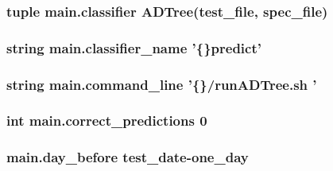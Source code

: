 \hypertarget{namespacemain_a07830f194ffad5f009530ec549a93b5f}{
\subsubsection[{classifier}]{\setlength{\rightskip}{0pt plus 5cm}tuple main.\-classifier {\bf A\-D\-Tree}({\bf test\-\_\-file}, {\bf spec\-\_\-file})}}\label{namespacemain_a07830f194ffad5f009530ec549a93b5f}
\hypertarget{namespacemain_ab4ac9dda3d2fa82f888de091614f6090}{
\subsubsection[{classifier\-\_\-name}]{\setlength{\rightskip}{0pt plus 5cm}string main.\-classifier\-\_\-name '\{\}predict'}}\label{namespacemain_ab4ac9dda3d2fa82f888de091614f6090}
\hypertarget{namespacemain_aafb9018fe880bf4127e57a72c103563b}{
\subsubsection[{command\-\_\-line}]{\setlength{\rightskip}{0pt plus 5cm}string main.\-command\-\_\-line '\{\}/run\-A\-D\-Tree.\-sh '}}\label{namespacemain_aafb9018fe880bf4127e57a72c103563b}
\hypertarget{namespacemain_af624554e0f6b710e1be0ba525c717b48}{
\subsubsection[{correct\-\_\-predictions}]{\setlength{\rightskip}{0pt plus 5cm}int main.\-correct\-\_\-predictions 0}}\label{namespacemain_af624554e0f6b710e1be0ba525c717b48}
\hypertarget{namespacemain_a13bddefadc5986a6f749db9e47271727}{
\subsubsection[{day\-\_\-before}]{\setlength{\rightskip}{0pt plus 5cm}main.\-day\-\_\-before test\-\_\-date-\/one\-\_\-day}}\label{namespacemain_a13bddefadc5986a6f749db9e47271727}

